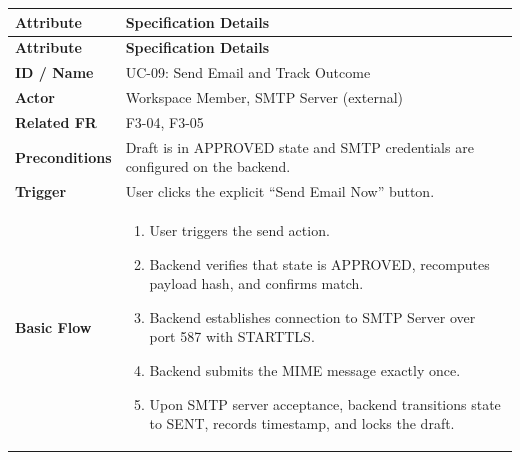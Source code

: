 \begin{longtable}{>{\raggedright\arraybackslash}p{}>{\raggedright\arraybackslash}p{}}

\hline

\rowcolor{tablehead}

\textbf{Attribute} & \textbf{Specification Details} \\ \hline

\endfirsthead

\hline

\rowcolor{tablehead}

\textbf{Attribute} & \textbf{Specification Details} \\ \hline

\endhead

\endfoot

\endlastfoot

\textbf{ID / Name} & UC-09: Send Email and Track Outcome \\ \hline

\textbf{Actor} & Workspace Member, SMTP Server (external) \\ \hline

\textbf{Related FR} & F3-04, F3-05 \\ \hline

\textbf{Preconditions} & Draft is in APPROVED state and SMTP credentials are configured on the backend. \\ \hline

\textbf{Trigger} & User clicks the explicit ``Send Email Now'' button. \\ \hline

\textbf{Basic Flow} & \begin{enumerate}[nosep,leftmargin=*,label=\arabic*.]

    \item User triggers the send action.

    \item Backend verifies that state is APPROVED, recomputes payload hash, and confirms match.

    \item Backend establishes connection to SMTP Server over port 587 with STARTTLS.

    \item Backend submits the MIME message exactly once.

    \item Upon SMTP server acceptance, backend transitions state to SENT, records timestamp, and locks the draft.


\end{enumerate}
\end{longtable}
